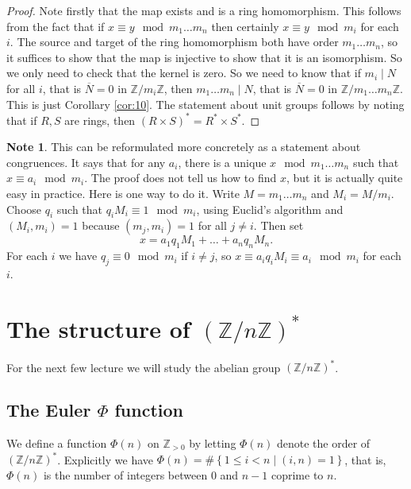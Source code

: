 \documentclass{article}
\newcommand{\Z}{\mathbb{Z}}
\newcommand{\rb}[1]{\left( #1 \right)}
\newcommand{\cb}[1]{\left\{ #1 \right\}}
\theoremstyle{definition}\newtheorem{definition}{Definition}
\theoremstyle{definition}\newtheorem*{remark}{Remark}
\theoremstyle{definition}\newtheorem*{example}{Example}
\theoremstyle{definition}\newtheorem*{note}{Note}
\begin{document}
\begin{proof}
Note firstly that the map exists and is a ring homomorphism. This follows from the fact that if $ x \equiv y \mod m_1 \dots m_n $ then certainly $ x \equiv y \mod m_i $ for each $ i $. The source and target of the ring homomorphism both have order $ m_1 \dots m_n $, so it suffices to show that the map is injective to show that it is an isomorphism. So we only need to check that the kernel is zero. So we need to know that if $ m_i \mid N $ for all $ i $, that is $ \overline{N} = 0 $ in $ \Z / m_i\Z $, then $ m_1 \dots m_n \mid N $, that is $ \overline{N} = 0 $ in $ \Z / m_1 \dots m_n\Z $. This is just Corollary \ref{cor:10}. The statement about unit groups follows by noting that if $ R, S $ are rings, then $ \rb{R \times S}^* = R^* \times S^* $.
\end{proof}

\begin{note}
This can be reformulated more concretely as a statement about congruences. It says that for any $ a_i $, there is a unique $ x \mod m_1 \dots m_n $ such that $ x \equiv a_i \mod m_i $. The proof does not tell us how to find $ x $, but it is actually quite easy in practice. Here is one way to do it. Write $ M = m_1 \dots m_n $ and $ M_i = M / m_i $. Choose $ q_i $ such that $ q_iM_i \equiv 1 \mod m_i $, using Euclid's algorithm and $ \rb{M_i, m_i} = 1 $ because $ \rb{m_j, m_i} = 1 $ for all $ j \ne i $. Then set
$$ x = a_1q_1M_1 + \dots + a_nq_nM_n. $$
For each $ i $ we have $ q_j \equiv 0 \mod m_i $ if $ i \ne j $, so $ x \equiv a_iq_iM_i \equiv a_i \mod m_i $ for each $ i $.
\end{note}

\section{The structure of $ \rb{\Z / n\Z}^* $}

For the next few lecture we will study the abelian group $ \rb{\Z / n\Z}^* $.

\subsection{The Euler $ \Phi $ function}

We define a function $ \Phi\rb{n} $ on $ \Z_{> 0} $ by letting $ \Phi\rb{n} $ denote the order of $ \rb{\Z / n\Z}^* $. Explicitly we have $ \Phi\rb{n} = \#\cb{1 \le i < n \mid \rb{i, n} = 1} $, that is, $ \Phi\rb{n} $ is the number of integers between $ 0 $ and $ n - 1 $ coprime to $ n $.
\end{document}
